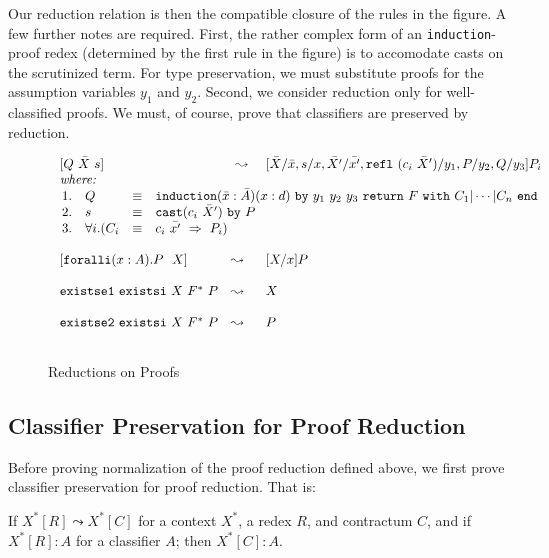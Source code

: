 \documentclass{fundam}
\begin{document}
Our reduction relation is then the compatible closure of the rules in
the figure.  A few further notes are required.  First, the rather
complex form of an \texttt{induction}-proof redex (determined by the
first rule in the figure) is to accomodate casts on the scrutinized
term.  For type preservation, we must substitute proofs for the
assumption variables $y_1$ and $y_2$.  Second, we consider reduction
only for well-classified proofs.  We must, of course, prove that
classifiers are preserved by reduction.

\begin{figure}
\[
\begin{array}{lll}
\ [Q \ 
 \bar{X}\ s] & \ \leadsto\ & [\bar{X}/\bar{x},s/x,\bar{X'}/\bar{x'},\texttt{refl}\ (c_i\ \bar{X}')/y_1,P/y_2,Q/y_3] P_i \\
\ \textit{where:} &\ &\ \\
\multicolumn{3}{l}
{\begin{array}{llll}
1. &  Q & \equiv & \texttt{induction}(\bar{x}:\bar{A})(x:d)\ \texttt{by}\ y_1\ y_2\ y_3\ \texttt{return}\ F 
\ \texttt{with}\ C_1 | \cdots | C_n\ \texttt{end} \\
2. & s & \equiv & \texttt{cast} (c_i\ \bar{X}')\ \texttt{by}\ P \\
3. & \forall i. (C_i & \equiv & c_i\ \bar{x'} \ \Rightarrow \ P_i)
\end{array}}
\\ \\
 \ [\texttt{foralli}(x:A).P\ \ X] & \leadsto & [X/x]P
\\ \\
\ \texttt{existse1}\ \texttt{existsi}\  X\ F^*\ P & \leadsto & X \\ \\
\ \texttt{existse2}\ \texttt{existsi}\ X\ F^*\ P & \leadsto & P
\\ \\
\end{array}
\]
\caption{\label{fig:pf-red}Reductions on Proofs}
\end{figure}

\subsection{Classifier Preservation for Proof Reduction}

Before proving normalization of the proof reduction defined above, we
first prove classifier preservation for proof reduction.  That is:

\begin{theorem}
\label{thm:tp-pres-pf} If
$X^*[R]\leadsto X^*[C]$ for a context $X^*$, a redex $R$, and
contractum $C$, and if $X^*[R] : A$ for a classifier $A$; then $X^*[C]
: A$.
\end{theorem}
\end{document}
